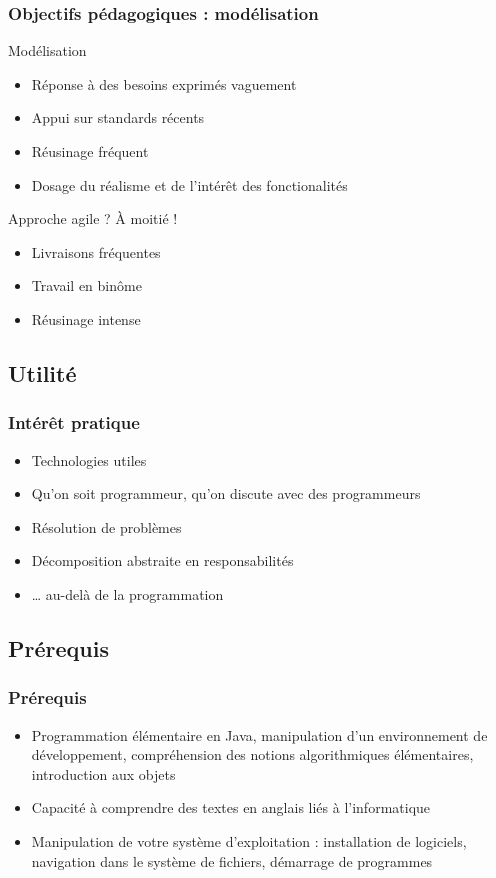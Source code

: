 \documentclass[english, french]{beamer}
\begin{document}
\begin{frame}
	\frametitle{Objectifs pédagogiques : modélisation}
	\begin{block}{Modélisation}
		\begin{itemize}
		\item Réponse à des besoins exprimés vaguement
		\item Appui sur standards récents
		\item Réusinage fréquent
		\item Dosage du réalisme et de l’intérêt des fonctionalités
		\end{itemize}
	\end{block}
	Approche agile ? À moitié !
	\begin{itemize}
		\item Livraisons fréquentes
		\item Travail en binôme
		\item Réusinage intense
	\end{itemize}
\end{frame}

\subsection{Utilité}
\begin{frame}
	\frametitle{Intérêt pratique}
	\begin{itemize}
		\item Technologies utiles
		\item Qu’on soit programmeur, qu’on discute avec des programmeurs
		\item Résolution de problèmes
		\item Décomposition abstraite en responsabilités
		\item … au-delà de la programmation
	\end{itemize}
\end{frame}

\subsection{Prérequis}
\begin{frame}
	\frametitle{Prérequis}
	\begin{itemize}
		\item Programmation élémentaire en Java, manipulation d’un environnement de développement, compréhension des notions algorithmiques élémentaires, introduction aux objets
		\item Capacité à comprendre des textes en anglais liés à l’informatique
		\item Manipulation de votre système d’exploitation : installation de logiciels, navigation dans le système de fichiers, démarrage de programmes
	\end{itemize}
\end{frame}
\end{document}
